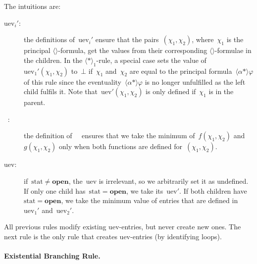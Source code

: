 \documentclass{entcs}
\newcommand{\pea}[2]{\langle#1\rangle #2}
\newcommand{\prp}[1]{#1*}
\newcommand{\fea}{$\pea{}{}$}
\newcommand{\tmrk}{\mathrm{stat}}
\newcommand{\tuev}{\mathrm{uev}}
\newcommand{\trero}{$\pea{\prp{}}{}_1$}
\newcommand{\tfalse}{\mathbf{open}}
\newcommand{\tmin}{\mathop{\mathrm{min}_{\bot}}}
\begin{document}
The intuitions are:
\begin{description}
\item[\rm $\tuev_i'$:] the definitions of~$\tuev_i'$ ensure
  that the pairs~$(\chi_1, \chi_2)$, where~$\chi_1$ is the principal \fea{}-formula,
  get the values from their corresponding \fea{}-formulae in the children.
  In the \trero{}-rule, a special case sets
  the value of~$\tuev_1'(\chi_1, \chi_2)$ to~$\bot$
  if~$\chi_1$ and~$\chi_2$ are equal
  to the principal formula~$\pea{\prp{\alpha}}{\varphi}$ of this rule
  since the eventuality~$\pea{\prp{\alpha}}{\varphi}$
  is no longer unfulfilled as the left child fulfils it.
  Note that~$\tuev'(\chi_1, \chi_2)$ is only defined
  if~$\chi_1$ is in the parent.
\item[\rm $\tmin$:] the definition of~$\tmin$ ensures
  that we take the minimum of~$f(\chi_1, \chi_2)$ and~$g(\chi_1, \chi_2)$
  only when both functions are defined for~$(\chi_1, \chi_2)$.
\item[\rm $\tuev$:] if~$\tmrk \neq \tfalse$,
  the~$\tuev$ is irrelevant,
  so we arbitrarily set it as undefined.
  If only one child has~$\tmrk = \tfalse$, we take its~$\tuev'$.
  If both children have~$\tmrk = \tfalse$,
  we take the minimum value of entries
  that are defined in~$\tuev_1'$ and~$\tuev_2'$.
\end{description}

All previous rules modify existing $\tuev$-entries, but never
create new ones.
The next rule is the only rule that creates $\tuev$-entries (by identifying loops).

\paragraph{Existential Branching Rule.}
\end{document}
